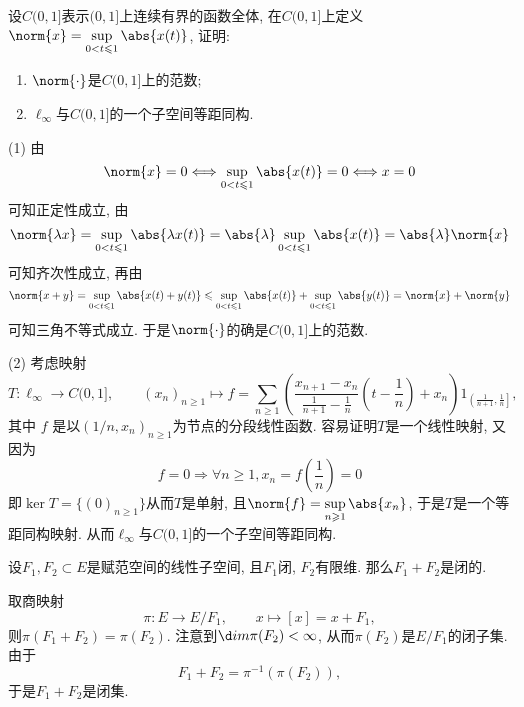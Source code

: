 	\begin{example}[张恭庆1.4.2]
		设$ C(0,1] $表示$ (0,1] $上连续有界的函数全体, 在$ C(0,1] $上定义$ \norm{x}=\sup\limits_{0<t\leqslant 1}\abs{x(t)} $, 证明:
		\begin{enumerate}
			\item $ \norm{\cdot} $是$ C(0,1] $上的范数;
			\item $ \ell_\infty $与$ C(0,1] $的一个子空间等距同构.
		\end{enumerate}
	\end{example}
	\begin{answer}
	(1) 由
	\[
	\norm{x}=0\Longleftrightarrow\sup_{0<t\leqslant 1}\abs{x(t)}=0\Longleftrightarrow x=0
	\]
	可知正定性成立, 由
	\[
	\norm{\lambda x}=\sup_{0<t\leqslant 1}\abs{\lambda x(t)}=\abs{\lambda}\sup_{0<t\leqslant 1}\abs{x(t)}=\abs{\lambda}\norm{x}
	\]
	可知齐次性成立, 再由
	\[
	\norm{x+y}=\sup_{0<t\leqslant 1}\abs{x(t)+y(t)}\leqslant\sup_{0<t\leqslant 1}\abs{x(t)}+\sup_{0<t\leqslant 1}\abs{y(t)}=\norm{x}+\norm{y}
	\]
	可知三角不等式成立. 于是$ \norm{\cdot} $的确是$ C(0,1] $上的范数.
	
	(2) 考虑映射
	\[
	T : \ell_\infty\to C(0,1],\qquad (x_n)_{n\geqslant 1}\mapsto f=\sum_{n\geqslant 1}\left(\frac{x_{n+1}-x_n}{\frac{1}{n+1}-\frac{1}{n}}\left(t-\frac{1}{n}\right)+x_n\right)1_{\left( \frac{1}{n+1},\frac{1}{n} \right]},
	\]
	其中 $ f $ 是以$ (1/n,x_n)_{n\geqslant 1} $为节点的分段线性函数. 容易证明$ T $是一个线性映射, 又因为
	\[
	f=0\Longrightarrow \forall n\geqslant 1, x_n=f\left(\frac{1}{n}\right)=0
	\]
	即$ \ker T=\{ (0)_{n\geqslant 1} \} $从而$ T $是单射, 且$ \norm{f}=\sup\limits_{n\geqslant 1}\abs{x_n} $, 于是$ T $是一个等距同构映射. 从而$ \ell_\infty $与$ C(0,1] $的一个子空间等距同构.\qedhere
	\end{answer}

	\begin{example}[Ps1010-6]
		设$ F_1,F_2\subset E $是赋范空间的线性子空间, 且$ F_1 $闭, $ F_2 $有限维. 那么$ F_1+F_2 $是闭的.
	\end{example}
	\begin{answer}
	取商映射
	\[
	\pi : E\to E/F_1,\qquad x\mapsto [x]=x+F_1,
	\]
	则$ \pi(F_1+F_2)=\pi(F_2) $. 注意到$ \d im\pi(F_2)<\infty $, 从而$ \pi(F_2) $是$ E/F_1 $的闭子集. 由于
	\[
	F_1+F_2=\pi^{-1}(\pi(F_2)),
	\]
	于是$ F_1+F_2 $是闭集.\qedhere
	\end{answer}

